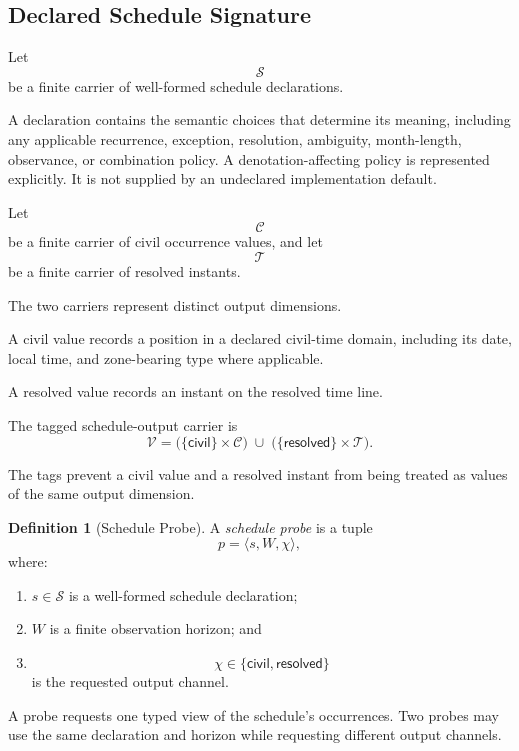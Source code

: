 \documentclass[11pt]{article}
\theoremstyle{plain}
\theoremstyle{definition}
\newtheorem{definition}[theorem]{Definition}
\theoremstyle{remark}
\begin{document}
\subsection{Declared Schedule Signature}

Let
\[
  \mathcal{S}
\]
be a finite carrier of well-formed schedule declarations.

A declaration contains the semantic choices
that determine its meaning,
including any applicable recurrence,
exception,
resolution,
ambiguity,
month-length,
observance,
or combination policy.
A denotation-affecting policy is represented explicitly.
It is not supplied by an undeclared implementation default.

Let
\[
  \mathcal{C}
\]
be a finite carrier of civil occurrence values,
and let
\[
  \mathcal{T}
\]
be a finite carrier of resolved instants.

The two carriers represent distinct output dimensions.

A civil value records a position
in a declared civil-time domain,
including its date,
local time,
and zone-bearing type where applicable.

A resolved value records an instant
on the resolved time line.

The tagged schedule-output carrier is
\[
  \mathcal{V}
  =
  \bigl(
  \{\mathsf{civil}\}
  \times
  \mathcal{C}
  \bigr)
  \;\cup\;
  \bigl(
  \{\mathsf{resolved}\}
  \times
  \mathcal{T}
  \bigr).
\]

The tags prevent a civil value
and a resolved instant
from being treated as values
of the same output dimension.

\begin{definition}[Schedule Probe]
  \label{ik.def.schedule-probe}
  A \emph{schedule probe} is a tuple
  \[
    p
    =
    \langle
    s,
    W,
    \chi
    \rangle,
  \]
  where:
  \begin{enumerate}[label=(\alph*)]
    \item \(s\in\mathcal{S}\)
          is a well-formed schedule declaration;
    \item \(W\) is a finite observation horizon; and
    \item
          \[
            \chi
            \in
            \{
            \mathsf{civil},
            \mathsf{resolved}
            \}
          \]
          is the requested output channel.
  \end{enumerate}
\end{definition}

A probe requests one typed view
of the schedule's occurrences.
Two probes may use the same declaration and horizon
while requesting different output channels.
\end{document}

